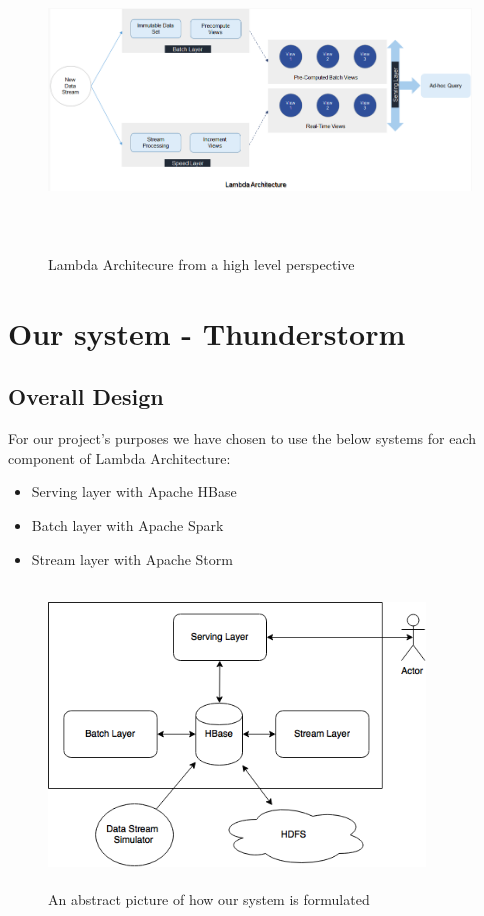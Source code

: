 \documentclass{lmproj}
\begin{document}
\bigskip
\begin{figure}[h]
	\centering
	\includegraphics[width=16cm, height=8cm]{la_overview}
	\caption{Lambda Architecure from a high level perspective}
\end{figure}


\chapter{Our system - Thunderstorm}
\label{systemdescr}

\section{Overall Design}
\label{systemdescr}

For our project's purposes we have chosen to use the below systems for each component of Lambda Architecture:

\begin{itemize}
	\item Serving layer with Apache HBase
	\item Batch layer with Apache Spark
	\item Stream layer with Apache Storm
\end{itemize}

\begin{figure}[h]
\centering
\includegraphics[width=10cm, height=8cm]{system}
\caption{An abstract picture of how our system is formulated}
\end{figure}
\end{document}
